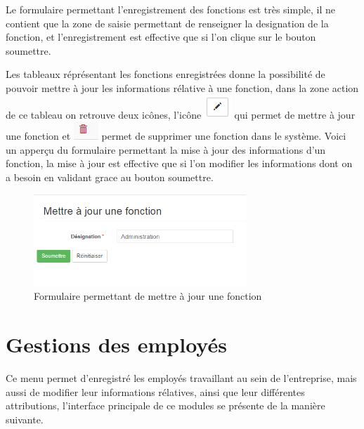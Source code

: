 \documentclass[12pt,a4paper]{report}
\begin{document}
Le formulaire permettant l'enregistrement des fonctions est très simple, il ne contient que la zone de saisie permettant de renseigner la designation de la fonction, et l'enregistrement est effective que si l'on clique sur le bouton soumettre. 

Les tableaux réprésentant les fonctions enregistrées donne la possibilité de pouvoir mettre à jour les informations rélative à une fonction, dans la zone action de ce tableau on retrouve deux icônes, l'icône \includegraphics[scale=0.7]{pic/EditBlack.png} qui permet de mettre à jour une fonction et \includegraphics[scale=0.7]{pic/DeleteWRed.png} permet de supprimer une fonction dans le système.
Voici un apperçu du formulaire permettant la mise à jour des informations d'un fonction, la mise à jour est effective que si l'on modifier les informations dont on a besoin en validant grace au bouton soumettre. 

\begin{figure}[h]
\begin{center}
\includegraphics[width=8cm]{pic/MettreAJFonction.png}
\end{center}
\caption{Formulaire permettant de mettre à jour une fonction}
\label{Formulaire permettant de mettre à jour une fonction}
\end{figure} 



\section{Gestions des employés}
Ce menu permet d'enregistré les employés travaillant au sein de l'entreprise, mais aussi de modifier leur informations rélatives, ainsi que leur différentes 	attributions, l'interface principale de ce modules se présente de la manière suivante.
\end{document}
